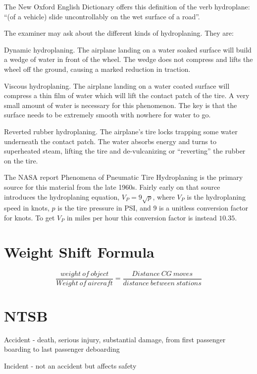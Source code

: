 The New Oxford English Dictionary offers this definition of the verb hydroplane: ``(of a vehicle) slide uncontrollably on the wet surface of a road''.

The examiner may ask about the different kinds of hydroplaning. They are:

Dynamic hydroplaning. The airplane landing on a water soaked surface will build a wedge of water in front of the wheel. The wedge does not compress and lifts the wheel off the ground, causing a marked reduction in traction.

Viscous hydroplaning. The airplane landing on a water coated surface will compress a thin film of water which will lift the contact patch of the tire. A very small amount of water is necessary for this phenomenon. The key is that the surface needs to be extremely smooth with nowhere for water to go.

Reverted rubber hydroplaning. The airplane's tire locks trapping some water underneath the contact patch. The water absorbs energy and turns to superheated steam, lifting the tire and de-vulcanizing or ``reverting'' the rubber on the tire.

The NASA report Phenomena of Pneumatic Tire Hydroplaning \cite{hydroplane} is the primary source for this material from the late 1960s. Fairly early on that source introduces the hydroplaning equation, $V_P = 9 \sqrt{p}$, where $V_P$ is the hydroplaning speed in knots, $p$ is the tire pressure in PSI, and $9$ is a unitless conversion factor for knots. To get $V_P$ in miles per hour this conversion factor is instead $10.35$.

\section{Weight Shift Formula}

\begin{equation}
    \frac{weight\ of\ object}{Weight\ of\ aircraft} = \frac{Distance\ CG\ moves}{distance\ between\ stations}
\end{equation}

\section{NTSB}

Accident - death, serious injury, substantial damage, from first passenger boarding to last passenger deboarding

Incident - not an accident but affects safety

